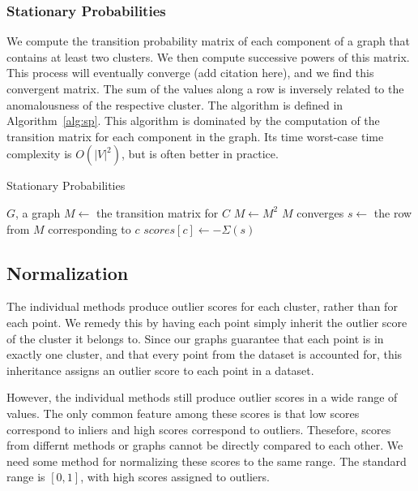 \subsubsection{Stationary Probabilities}
We compute the transition probability matrix of each component of a graph that contains at least two clusters.
We then compute successive powers of this matrix. %
This process will eventually converge (add citation here), and we find this convergent matrix.
The sum of the values along a row is inversely related to the anomalousness of the respective cluster. The algorithm is defined in Algorithm~\ref{alg:sp}.
This algorithm is dominated by the computation of the transition matrix for each component in the graph.
Its time worst-case time complexity is $O(|V|^2)$, but is often better in practice.

\begin{algorithm}[h]
    \caption{Stationary Probabilities}
    \label{alg:sp}
\begin{algorithmic}[1]
    \Require $G$, a graph
        \State $M \gets$ the transition matrix for $C$
        \Repeat
            \State $M \gets M^2$
        \Until $M$ converges
            \State $s \gets $ the row from $M$ corresponding to $c$
            \State $scores[c] \gets -\Sigma(s)$ 
        \EndFor
    \EndFor
\end{algorithmic}
\end{algorithm}




\subsection{Normalization}\label{subsec:methods:normalization}
The individual methods produce outlier scores for each cluster, rather than for each point.
We remedy this by having each point simply inherit the outlier score of the cluster it belongs to.
Since our graphs guarantee that each point is in exactly one cluster, and that every point from the dataset is accounted for, this inheritance assigns an outlier score to each point in a dataset.

However, the individual methods still produce outlier scores in a wide range of values.
The only common feature among these scores is that low scores correspond to inliers and high scores correspond to outliers.
Thesefore, scores from differnt methods or graphs cannot be directly compared to each other.
We need some method for normalizing these scores to the same range.
The standard range is $[0, 1]$, with high scores assigned to outliers.

